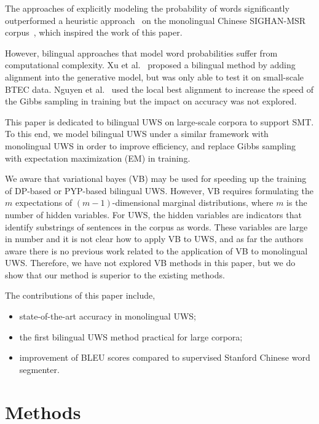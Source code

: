 \documentclass[11pt]{article}
\begin{document}
The approaches of explicitly modeling the probability of
words\cite{brent1999efficient,venkataraman2001statistical,goldwater2006contextual,goldwater2009bayesian,mochihashi2009bayesian}
significantly outperformed a heuristic approach~\cite{zhao2008empirical}
on the monolingual Chinese SIGHAN-MSR corpus~\cite{emerson2005second},
which inspired the work of this paper.

However, bilingual approaches that model word probabilities suffer from
computational complexity. Xu et al.~ proposed
a bilingual method by adding alignment into the generative model, but
was only able to test it on small-scale BTEC data. Nguyen et al.~  
used the local best alignment to increase the speed of the Gibbs sampling in training but the impact
on accuracy was not explored.

This paper is dedicated to bilingual UWS  on large-scale corpora to
support SMT. To this end, we model bilingual UWS under a similar framework
with monolingual UWS in order to improve efficiency,
and replace Gibbs sampling with expectation maximization (EM) in training.  

We aware that variational bayes (VB) may be used for speeding up the
training of DP-based or PYP-based bilingual UWS. However, VB requires
formulating  the $m$ expectations of  $(m-1)$-dimensional marginal
distributions, where $m$ is the number of hidden variables. For UWS, the
hidden variables are indicators that identify substrings of sentences in
the corpus as words. These variables are large in number and it is not
clear how to apply VB to UWS, and as far the authors aware there is
no previous work related to the application of VB to monolingual UWS.
Therefore, we have not explored VB methods in this paper, but we do show
that our method is superior to the existing methods.

The contributions of this paper include,
\begin{itemize}
\item state-of-the-art accuracy in monolingual UWS;
\item the first bilingual UWS method practical for large corpora;
\item improvement of BLEU scores compared to supervised Stanford Chinese word segmenter.
\end{itemize}

\section{Methods}
\end{document}
